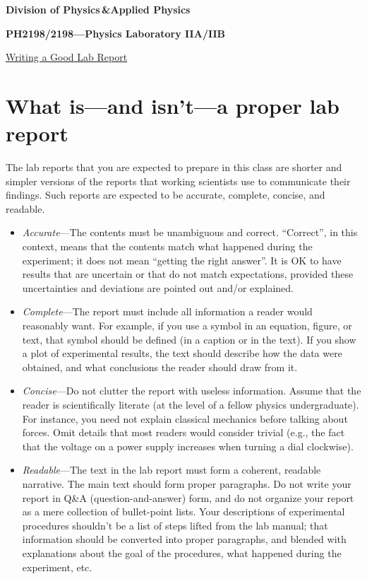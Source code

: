 \documentclass[11pt,a4paper]{article}
\begin{document}
\begin{center}
\textbf{Division of Physics\;\,\&\;Applied Physics}

\textbf{PH2198/2198---Physics Laboratory IIA/IIB}

\vskip 0.05in

\underline{\Huge Writing a Good Lab Report}
\end{center}

\section{What is---and isn't---a proper lab report}

The lab reports that you are expected to prepare in this class are
shorter and simpler versions of the reports that working scientists
use to communicate their findings.  Such reports are expected to be
accurate, complete, concise, and readable.

\begin{itemize}
\item \textit{Accurate}---The contents must be unambiguous and
  correct.  ``Correct'', in this context, means that the contents
  match what happened during the experiment; it does not mean
  ``getting the right answer''.  It is OK to have results that are
  uncertain or that do not match expectations, provided these
  uncertainties and deviations are pointed out and/or explained.

\item \textit{Complete}---The report must include all information a
  reader would reasonably want.  For example, if you use a symbol in
  an equation, figure, or text, that symbol should be defined (in a
  caption or in the text).  If you show a plot of experimental
  results, the text should describe how the data were obtained, and
  what conclusions the reader should draw from it.

\item \textit{Concise}---Do not clutter the report with useless
  information.  Assume that the reader is scientifically literate (at
  the level of a fellow physics undergraduate).  For instance, you
  need not explain classical mechanics before talking about forces.
  Omit details that most readers would consider trivial (e.g., the
  fact that the voltage on a power supply increases when turning a
  dial clockwise).

\item \textit{Readable}---The text in the lab report must form a
  coherent, readable narrative.  The main text should form proper
  paragraphs.  Do not write your report in Q\&A (question-and-answer)
  form, and do not organize your report as a mere collection of
  bullet-point lists.  Your descriptions of experimental procedures
  shouldn't be a list of steps lifted from the lab manual; that
  information should be converted into proper paragraphs, and blended
  with explanations about the goal of the procedures, what happened
  during the experiment, etc.
\end{itemize}
\end{document}
